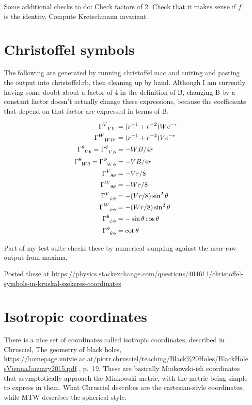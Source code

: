 \documentclass{article}
\begin{document}
Some additional checks to do: 
Check factors of 2. Check that it makes sense if $f$ is the identity.
Compute Kretschmann invariant.

\section{Christoffel symbols}

The following are generated by running christoffel.mac and cutting and pasting the output into
christoffel.rb, then cleaning up by hand. Although I am currently having some doubt about a
factor of 4 in the definition of B,
changing B by a constant factor doesn't actually change these expressions, because the
coefficients that depend on that factor
are expressed in terms of B.

\begin{align}
\Gamma\indices{^V_V_V} &= (r^{-1}+r^{-2})We^{-r} \\
\Gamma\indices{^W_W_W} &= (r^{-1}+r^{-2})Ve^{-r} \\
\Gamma\indices{^\theta_V_\theta} = \Gamma\indices{^\phi_V_\phi} &= -WB/4r  \\
\Gamma\indices{^\theta_W_\theta} = \Gamma\indices{^\phi_W_\phi} &= -VB/4r  \\
%
\Gamma\indices{^V_\theta_\theta} &= -Vr/8\\
\Gamma\indices{^W_\theta_\theta} &= -Wr/8\\
\Gamma\indices{^V_\phi_\phi} &= -(Vr/8) \sin^2\theta\\
\Gamma\indices{^W_\phi_\phi} &= -(Wr/8) \sin^2\theta\\
%
\Gamma\indices{^\theta_\phi_\phi} &= -\sin\theta \cos\theta   \\
\Gamma\indices{^\phi_\theta_\phi} &= \cot\theta   
\end{align}

Part of my test suite checks
these by numerical sampling against the near-raw output from maxima.

Posted these at \url{https://physics.stackexchange.com/questions/404611/christoffel-symbols-in-kruskal-szekeres-coordinates}

\section{Isotropic coordinates}

There is a nice set of coordinates called isotropic coordinates,
described in Chrusciel, The geometry of black holes,
\url{https://homepage.univie.ac.at/piotr.chrusciel/teaching/Black%20Holes/BlackHolesViennaJanuary2015.pdf} ,
p.~19. These are basically Minkowski-ish coordinates that asymptotically approach the Minkowski
metric, with the metric being simple to express in them.  What Chrusciel describes are
the cartesian-style coordinates, while MTW describes the spherical style.
\end{document}
